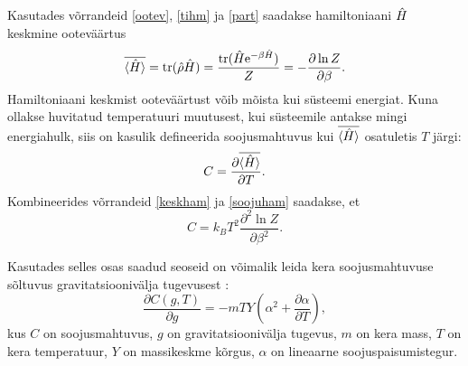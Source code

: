 \documentclass{trkut}%
\DeclareMathOperator{\tr}{tr}
\renewcommand\braket[1]{\langle{#1}\rangle}
\begin{document}
Kasutades võrrandeid \eqref{ootev}, \eqref{tihm} ja \eqref{part} saadakse hamiltoniaani $\op{H}$ keskmine ooteväärtus
\begin{equation}
    \overline{\braket{\op{H}}}=\tr(\op{\rho}\op{H})=\frac{\tr(\op{H}\mathrm{e}^{-\beta \op{H}})}{Z}= -\frac{\partial \ln Z}{\partial \beta}.
    \label{keskham}
\end{equation}
Hamiltoniaani keskmist ooteväärtust võib mõista kui süsteemi energiat. Kuna ollakse huvitatud temperatuuri muutusest, kui süsteemile antakse mingi energiahulk, siis on kasulik defineerida soojusmahtuvus kui $\overline{\braket{\op{H}}}$ osatuletis $T$ järgi:
\begin{equation}
    C = \frac{\partial \overline{\braket{\op{H}}}}{\partial T}.
    \label{soojuham}
\end{equation}
Kombineerides võrrandeid \eqref{keskham} ja \eqref{soojuham} saadakse, et
\begin{equation}
    C = k_B T^2 \frac{\partial^2 \ln Z}{\partial \beta^2}.
    \label{mahtuvus}
\end{equation}

Kasutades selles osas saadud seoseid on võimalik leida kera soojusmahtuvuse sõltuvus gravitatsioonivälja tugevusest \parencite[10-13]{palma15}:
\begin{equation} \label{palmasor}
    \frac{\partial C(g,T)}{\partial g} = -mTY \left( \alpha^2 + \frac{\partial \alpha}{\partial T} \right),
\end{equation}
kus \(C\) on soojusmahtuvus, \(g\) on gravitatsioonivälja tugevus, \(m\) on kera mass, \(T\) on kera temperatuur, \(Y\) on massikeskme kõrgus, \(\alpha\) on lineaarne soojuspaisumistegur.
\end{document}
